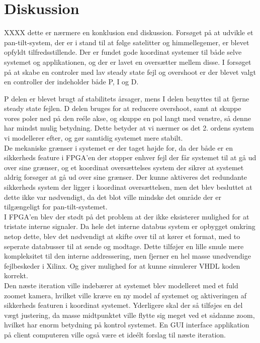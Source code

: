 \section{Diskussion}
XXXX dette er nærmere en konklusion end diskussion.
Forsøget på at udvikle et pan-tilt-system, der er i stand til at følge satelitter og himmellegemer, er blevet opfyldt tilfredsstillende. Der er fundet gode koordinat systemer til både selve systemet og applikationen, og der er lavet en oversætter mellem disse. I forsøget på at skabe en controler med lav steady state fejl og overshoot er der blevet valgt en controller der indeholder både P, I og D.

P delen er blevet brugt af stabilitets årsager, mens I delen benyttes til at fjerne steady state fejlen. D delen bruges for at reducere overshoot, samt at skuppe vores poler ned på den reéle akse, og skuppe en pol langt med venstre, så denne har mindst mulig betydning. Dette betyder at vi nærmer os det 2. ordens system vi modellerer efter, og gør samtidig systemet mere stabilt.
\\
De mekaniske grænser i systemet er der taget højde for, da der både er en sikkerheds feature i FPGA'en der stopper enhver fejl der får systemet til at gå ud over sine grænser, og et koordinat oversættelses system der sikrer at systemet aldrig forsøger at gå ud over sine grænser. Der kunne aktiveres det redundante sikkerheds system der ligger i koordinat oversættelsen, men det blev besluttet at dette ikke var nødvendigt, da det blot ville mindske det område der er tilgængeligt for pan-tilt-systemet.
\\
I FPGA'en blev der stødt på det problem at der ikke eksisterer mulighed for at tristate interne signaler. Da hele det interne databus system er opbygget omkring netop dette, blev det nødvendigt at skifte over til at kører et format, med to seperate databusser til at sende og modtage. Dette tilføjer en lille smule mere kompleksitet til den interne addressering, men fjerner en hel masse unødvendige fejlbeskeder i Xilinx. Og giver mulighed for at kunne simulerer VHDL koden korrekt.
\\
Den næste iteration ville indebærer at systemet blev modelleret med et fuld zoomet kamera, hvilket ville kræve en ny model af systemet og aktiveringen af sikkerheds featuren i koordinat systemet. Yderligere skal der så tilføjes en del vægt justering, da masse midtpunktet ville flytte sig meget ved et sådanne zoom, hvilket har enorm betydning på kontrol systemet. En GUI interface applikation på client computeren ville også være et ideélt forslag til næste iteration.